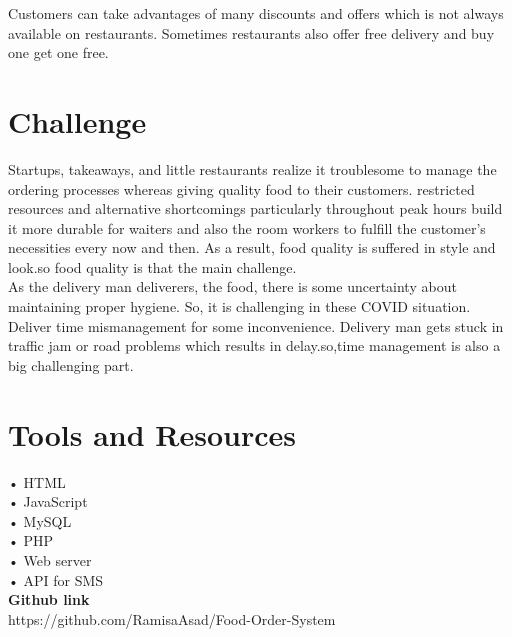 \documentclass[letterpaper]{report}
\begin{document}
Customers can take advantages of many discounts and offers which is not always available on restaurants. Sometimes restaurants also offer free delivery and buy one get one free.
\section{Challenge}

Startups, takeaways, and little restaurants realize it troublesome to manage the ordering processes whereas giving quality food to their customers. restricted resources and alternative shortcomings particularly throughout peak hours build it more durable for waiters and also the room workers to fulfill the customer’s necessities every now and then. As a result, food quality is suffered in style and look.so food quality is that the main challenge.\\
As the delivery man deliverers, the food, there is some uncertainty about maintaining proper hygiene. So, it is challenging in these COVID situation.\\
 Deliver time mismanagement for some inconvenience. Delivery man gets stuck in traffic jam or road problems which results in delay.so,time management is also a big challenging part.
\newpage


\section{Tools and Resources}
•	HTML\\ 
•	JavaScript\\
•	MySQL\\
•	PHP\\
•	Web server\\
•	API for SMS\\[0.5cm]

\centering
\textbf{Github link}\\
https://github.com/RamisaAsad/Food-Order-System
\end{document}
